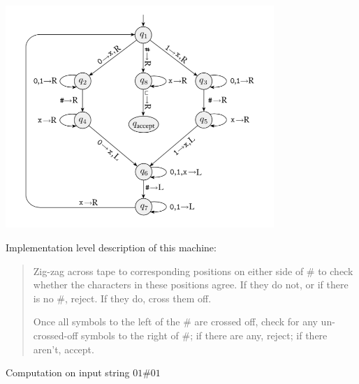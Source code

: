 \documentclass[12pt, oneside]{article}
\begin{document}
\begin{multicols}{2}
\vspace{-20pt}
\begin{center}
\includegraphics[width=4in]{resources/machines/Lect13TM3.png}
\end{center}

Implementation level description of this machine:
\begin{quote}
Zig-zag across tape to corresponding positions on either side of $\#$ to check whether the 
characters in these positions agree. If they do not, or if there is no $\#$, reject. If they 
do, cross them off.

Once all symbols to the left of the $\#$ are crossed off, check for any un-crossed-off symbols 
to the right of $\#$; if there are any, reject; if there aren't, accept.
\end{quote}

\columnbreak

Computation on  input  string  $01\#01$


\end{multicols}
\end{document}
